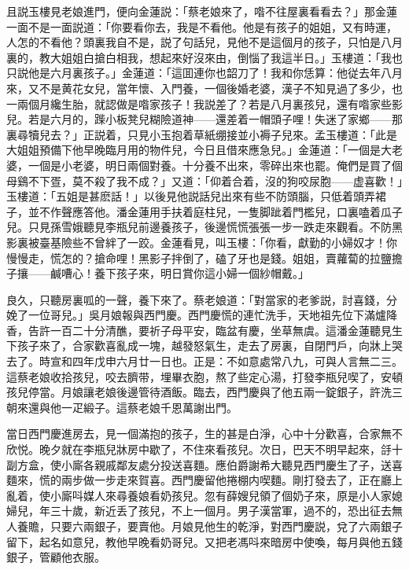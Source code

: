 且説玉樓見老娘進門，便向金蓮説：「蔡老娘來了，喒不往屋裏看看去？」那金蓮一面不是一面説道：「你要看你去，我是不看他。他是有孩子的姐姐，又有時運，人怎的不看他？頭裏我自不是，説了句話兒，見他不是這個月的孩子，只怕是八月裏的，教大姐姐白搶白相我，想起來好沒來由，倒惱了我這半日。」玉樓道：「我也只説他是六月裏孩子。」金蓮道：「這囬連你也韶刀了！我和你恁算：他従去年八月來，又不是黄花女兒，當年懷、入門養，一個後婚老婆，漢子不知見過了多少，也一兩個月纔生胎，就認做是喒家孩子！我説差了？若是八月裏孩兒，還有喒家些影兒。若是六月的，䠕小板凳兒糊險道神——還差着一帽頭子哩！失迷了家鄉——那裏尋犢兒去？」正説着，只見小玉抱着草紙绷接並小褥子兒來。孟玉樓道：「此是大姐姐預備下他早晚臨月用的物件兒，今日且借來應急兒。」金蓮道：「一個是大老婆，一個是小老婆，明日兩個對養。十分養不出來，零碎出來也罷。俺們是買了個母鷄不下疍，莫不殺了我不成？」又道：「仰着合着，沒的狗咬尿胞——虚喜歡！」玉樓道：「五姐是甚麽話！」以後見他説話兒出來有些不防頭腦，只低着頭弄裙子，並不作聲應答他。潘金蓮用手扶着庭柱兒，一隻脚跐着門檻兒，口裏嗑着瓜子兒。只見孫雪娥聽見李瓶兒前邊養孩子，後邊慌慌張張一步一跌走來觀看。不防黑影裏被臺基險些不曾絆了一跤。金蓮看見，叫玉樓：「你看，獻勤的小婦奴才！你慢慢走，慌怎的？搶命哩！黑影子拌倒了，磕了牙也是錢。姐姐，賣蘿蔔的拉鹽擔子攘——鹹嘈心！養下孩子來，明日賞你這小婦一個紗帽戴。」

良久，只聽房裏呱的一聲，養下來了。蔡老娘道：「對當家的老爹説，討喜錢，分娩了一位哥兒。」吳月娘報與西門慶。西門慶慌的連忙洗手，天地祖先位下滿爐降香，告許一百二十分清醮，要祈子母平安，臨盆有慶，坐草無虞。這潘金蓮聽見生下孩子來了，合家歡喜亂成一塊，越發怒氣生，走去了房裏，自閉門戶，向牀上哭去了。時宣和四年戊申六月廿一日也。正是：不如意處常八九，可與人言無二三。這蔡老娘收拾孩兒，咬去臍带，埋畢衣胞，熬了些定心湯，打發李瓶兒喫了，安頓孩兒停當。月娘讓老娘後邊管待酒飯。臨去，西門慶與了他五兩一錠銀子，許洗三朝來還與他一疋緞子。這蔡老娘千恩萬謝出門。

當日西門慶進房去，見一個滿抱的孩子，生的甚是白淨，心中十分歡喜，合家無不欣悦。晚夕就在李瓶兒牀房中歇了，不住來看孩兒。次日，巴天不明早起來，㧱十副方盒，使小廝各親戚鄰友處分投送喜麵。應伯爵謝希大聽見西門慶生了子，送喜麵來，慌的兩步做一步走來賀喜。西門慶留他捲棚内喫麵。剛打發去了，正在廳上亂着，使小廝呌媒人來尋養娘看奶孩兒。忽有薛嫂兒領了個奶子來，原是小人家媳婦兒，年三十歲，新近丢了孩兒，不上一個月。男子漢當軍，過不的，恐出征去無人養贍，只要六兩銀子，要賣他。月娘見他生的乾淨，對西門慶説，兌了六兩銀子留下，起名如意兒，教他早晚看奶哥兒。又把老馮呌來暗房中使喚，每月與他五錢銀子，管顧他衣服。

